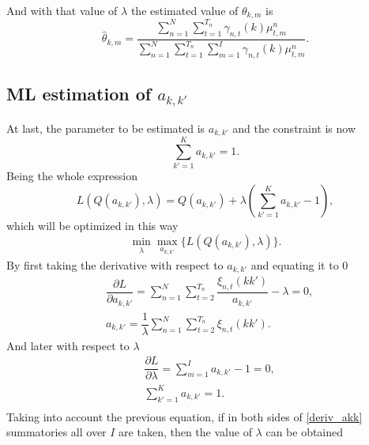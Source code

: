 \documentclass[12pt]{article}
\begin{document}
And with that value of $\lambda$ the estimated value of $\theta_{k,m}$ is
\begin{equation}
\widehat{\theta}_{k,m} = \dfrac{\sum \limits_{n=1}^{N} \sum \limits_ { t = 1 } ^ { T _ { n } }\gamma_{n,t}(k)\mu_{t,m}^{n}}{\sum \limits_{n=1}^{N}\sum \limits_ { t = 1 } ^ { T _ { n } }\sum \limits_{m=1}^{I}\gamma_{n,t}(k)\mu_{t,m}^{n}}.
\end{equation}
\subsection{ML estimation of $a_{k,k'}$}
At last, the parameter to be estimated is $a_{k,k'}$ and the constraint is now
\begin{equation}
\label{constraint_akk}
\sum \limits_{k'=1}^{K} a_{k,k'} = 1.
\end{equation}
Being the whole expression
\begin{equation}
\label{lagrange_akk}
L\left( Q(a_{k,k'}),\lambda \right) = Q(a_{k,k'}) + \lambda \left( \sum \limits_{k'=1}^{K} a_{k,k'} - 1 \right),
\end{equation}
which will be optimized in this way
\begin{equation}
\label{minmax_lagrange_akk}
\min_{\substack{\lambda}} \max_{\substack{a_{k,k'}}} \lbrace L\left( Q(a_{k,k'}),\lambda \right) \rbrace.
\end{equation}
By first taking the derivative with respect to $a_{k,k'}$ and equating it to 0
\begin{equation}
\label{deriv_akk}
\begin{split}
& \dfrac{\partial L}{\partial a_{k,k'}} = \sum \limits_{n=1}^{N}\sum _ { t = 2 } ^ { T _ { n } } \dfrac{\xi_{n,t}(kk')}{a_{k,k'}} - \lambda = 0, \\
& a_{k,k'} = \dfrac{1}{\lambda} \sum \limits_{n=1}^{N} \sum _ { t = 2 } ^ { T _ { n } }\xi_{n,t}(kk').
\end{split}
\end{equation}
And later with respect to $\lambda$
\begin{equation}
\begin{split}
& \dfrac{\partial L}{\partial \lambda} = \sum \limits_{m=1}^{I} a_{k,k'} - 1 = 0 ,\\
& \sum \limits_{k'=1}^{K} a_{k,k'} = 1.\\
\end{split}
\end{equation}
Taking into account the previous equation, if in both sides of \eqref{deriv_akk} summatories all over $I$ are taken, then the value of $\lambda$ can be obtained
\end{document}
